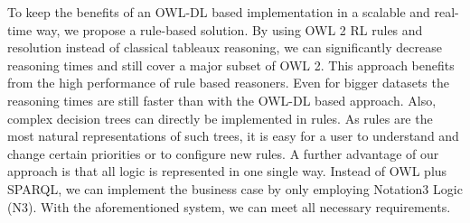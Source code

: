 To keep the benefits of an OWL-DL based implementation in a scalable and real-time way, we propose a rule-based solution.
By using OWL 2 RL rules and resolution instead of classical tableaux reasoning, we can significantly decrease reasoning times and still cover a major subset
of OWL 2. This approach benefits from the high performance of rule based reasoners. 
Even for bigger datasets the reasoning times are still faster than with the OWL-DL based approach. %
Also, complex decision trees can directly be implemented in rules. %
As rules are the most natural representations of such trees, 
it is easy for a user to understand and change certain priorities 
or to configure new rules. A further advantage of our approach is that all logic is represented in one single way. Instead of
OWL plus SPARQL, we can implement the business case by only employing Notation3 Logic (N3). With the aforementioned system, we can meet all necessary requirements.
%
%
%
%


